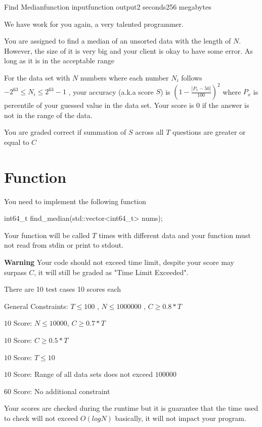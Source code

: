 \documentclass[11pt,a4paper]{article}
\begin{document}
\begin{problem}{Find Median}{function input}{function output}{2 seconds}{256 megabytes}

We have work for you again, a very talented programmer.

You are assigned to find a median of an unsorted data with the length of $N$. However, the size of it is very big and your client is okay to have some error. As long as it is in the acceptable range

For the data set with $N$ numbers where each number $N_i$ follows $-2^{63} \le N_i \le 2^{63} - 1$ , your accuracy (a.k.a score $S$) is $(1 - \frac{|P_x - 50|}{100})^2$ where $P_x$ is percentile of your guessed value in the data set. Your score is $0$ if the answer is not in the range of the data.

You are graded correct if summation of $S$ across all $T$ questions are greater or equal to $C$

\section*{Function}

You need to implement the following function

\begin{simplechar}
    int64_t find_median(std::vector<int64_t> nums);
\end{simplechar}

Your function will be called $T$ times with different data and your function must not read from stdin or print to stdout.

\textbf{Warning} Your code should not exceed time limit, despite your score may surpass $C$, it will still be graded as "Time Limit Exceeded".

\Scoring

There are 10 test cases 10 scores each

General Constraints: $T \le 100$ , $N \le 1000000$ , $C \ge 0.8*T$

$10$ Score: $N \le 10000$, $C \ge 0.7*T$

$10$ Score: $C \ge 0.5*T$

$10$ Score: $T \le 10$

$10$ Score: Range of all data sets does not exceed $100000$

$60$ Score: No additional constraint

Your scores are checked during the runtime but it is guarantee that the time used to check will not exceed $O(logN)$ basically, it will not impact your program.


\end{problem}
\end{document}
